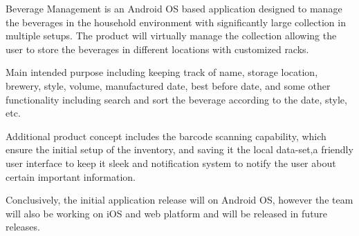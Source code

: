 Beverage Management is an Android OS based application designed to manage the beverages in the household environment with significantly large collection in multiple setups. The product will virtually manage the collection allowing the user to store the beverages in different locations with customized racks.

Main intended purpose including keeping track of name, storage location, brewery, style, volume, manufactured date, best before date, and some other functionality including search and sort the beverage according to the date, style, etc.   

Additional product concept includes the barcode scanning capability, which ensure the initial setup of the inventory, and saving it the local data-set,a friendly user interface to keep it sleek and notification system to notify the user about certain important information. 

Conclusively, the initial application release will on Android OS, however the team will also be working on iOS and web platform and will be released in future releases. 